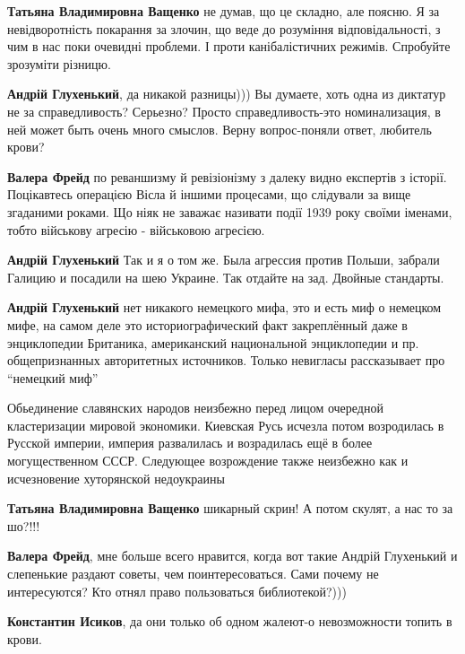 \begin{itemize}
\begin{itemize}
\textbf{Татьяна Владимировна Ващенко} не думав, що це складно, але поясню. Я за
невідворотність покарання за злочин, що веде до розуміння відповідальності, з
чим в нас поки очевидні проблеми. І проти канібалістичних режимів. Спробуйте
зрозуміти різницю.

\textbf{Андрій Глухенький}, да никакой разницы))) Вы думаете, хоть одна из
диктатур не за справедливость? Серьезно? Просто справедливость-это
номинализация, в ней может быть очень много смыслов.  Верну вопрос-поняли
ответ, любитель крови?

\textbf{Валера Фрейд} по реваншизму й ревізіонізму з далеку видно експертів з
історії. Поцікавтесь операцією Вісла й іншими процесами, що слідували за вище
згаданими роками. Що ніяк не заважає називати події 1939 року своїми іменами,
тобто військову агресію - військовою агресією.

\textbf{Андрій Глухенький} Так и я о том же. Была агрессия против Польши,
забрали Галицию и посадили на шею Украине. Так отдайте на зад.  Двойные
стандарты.


\textbf{Андрій Глухенький} нет никакого немецкого мифа, это и есть миф о
немецком мифе, на самом деле это историографический факт закреплённый даже в
энциклопедии Британика, американский национальной энциклопедии и пр.
общепризнанных авторитетных источников. Только невигласы рассказывает про
\enquote{немецкий миф}

Обьединение славянских народов неизбежно перед лицом очередной кластеризации
мировой экономики. Киевская Русь исчезла потом возродилась в Русской империи,
империя развалилась и возрадилась ещё в более могущественном СССР. Следующее
возрождение также неизбежно как и исчезновение хуторянской недоукраины

\textbf{Татьяна Владимировна Ващенко} шикарный скрин!
А потом скулят, а нас то за шо?!!!

\textbf{Валера Фрейд}, мне больше всего нравится, когда вот такие Андрій Глухенький и слепенькие раздают советы, чем поинтересоваться. Сами почему не интересуются? Кто отнял право пользоваться библиотекой?)))

\textbf{Константин Исиков}, да они только об одном жалеют-о невозможности топить в крови.


\end{itemize}
\end{itemize}
